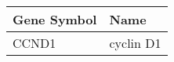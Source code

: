 \begin{tabular}{ll}
\toprule
Gene Symbol &      Name \\
\midrule
      CCND1 & cyclin D1 \\
\bottomrule
\end{tabular}
